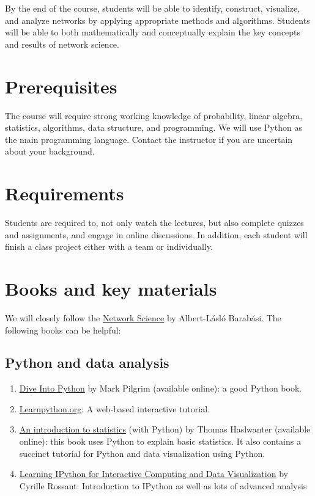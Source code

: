 \documentclass[11pt,article,oneside]{memoir}
\begin{document}
By the end of the course, students will be able to identify, construct,
visualize, and analyze networks by applying appropriate methods and algorithms.
Students will be able to both mathematically and conceptually explain the key
concepts and results of network science. 

\section{Prerequisites}
\label{sec:Prerequisites}

The course will require strong working knowledge of probability, linear
algebra, statistics, algorithms, data structure, and programming. We will use
Python as the main programming language. Contact the instructor if you are
uncertain about your background. 

\section{Requirements}
\label{sec:requirements}

Students are required to, not only watch the lectures, but also complete
quizzes and assignments, and engage in online discussions. In addition, each
student will finish a class project either with a team or individually. 

\section{Books and key materials}

We will closely follow the
\href{http://barabasi.com/networksciencebook/}{Network Science} by Albert-Lásló
Barabási. The following books can be helpful:

\subsection{Python and data analysis}

\begin{enumerate}

\item \href{http://www.diveintopython3.net/index.html}{Dive Into Python} by Mark Pilgrim (available online): a good Python book. 

\item \href{http://www.learnpython.org}{Learnpython.org}: A web-based interactive tutorial. 

\item \href{http://work.thaslwanter.at/Stats/html/}{An introduction to statistics} (with Python) by Thomas Haslwanter (available online): this book uses Python to explain basic statistics. It also contains a succinct tutorial for Python and data visualization using Python. 

\item \href{http://ipython.rossant.net}{Learning IPython for Interactive Computing and Data Visualization} by  Cyrille Rossant: Introduction to IPython as well as lots of advanced analysis 


\end{enumerate}
\end{document}
